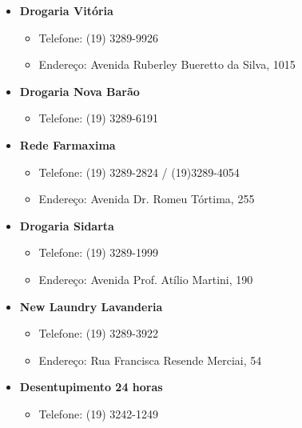 \begin{itemize}
\item  \textbf{Drogaria Vitória}
\begin{itemize}
\item  Telefone: (19) 3289-9926
\item  Endereço: Avenida Ruberley Bueretto da Silva, 1015
\end{itemize}
\end{itemize}

\begin{itemize}
\item  \textbf{Drogaria Nova Barão}
\begin{itemize}
\item  Telefone: (19) 3289-6191
\end{itemize}
\end{itemize}

\begin{itemize}
\item  \textbf{Rede Farmaxima}
\begin{itemize}
\item  Telefone: (19) 3289-2824 / (19)3289-4054
\item  Endereço: Avenida Dr. Romeu Tórtima, 255
\end{itemize}
\end{itemize}

\begin{itemize}
\item  \textbf{Drogaria Sidarta}
\begin{itemize}
\item  Telefone: (19) 3289-1999
\item  Endereço: Avenida Prof. Atílio Martini, 190
\end{itemize}
\end{itemize}

\begin{itemize}
\item  \textbf{New Laundry Lavanderia}
\begin{itemize}
\item  Telefone: (19) 3289-3922
\item  Endereço: Rua Francisca Resende Merciai, 54
\end{itemize}
\end{itemize}

\begin{itemize}
\item  \textbf{Desentupimento 24 horas}
\begin{itemize}
\item  Telefone: (19) 3242-1249
\end{itemize}
\end{itemize}


